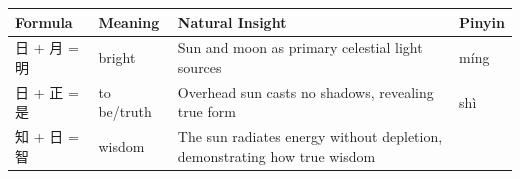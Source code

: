 \begin{longtable}[]{@{}llll@{}}
\toprule
\begin{minipage}[b]{0.19\columnwidth}\raggedright
Formula\strut
\end{minipage} & \begin{minipage}[b]{0.19\columnwidth}\raggedright
Meaning\strut
\end{minipage} & \begin{minipage}[b]{0.33\columnwidth}\raggedright
Natural Insight\strut
\end{minipage} & \begin{minipage}[b]{0.19\columnwidth}\raggedright
Pinyin\strut
\end{minipage}\tabularnewline
\midrule
\endhead
\begin{minipage}[t]{0.19\columnwidth}\raggedright
日 + 月 = 明\strut
\end{minipage} & \begin{minipage}[t]{0.19\columnwidth}\raggedright
bright\strut
\end{minipage} & \begin{minipage}[t]{0.33\columnwidth}\raggedright
Sun and moon as primary celestial light sources\strut
\end{minipage} & \begin{minipage}[t]{0.19\columnwidth}\raggedright
míng\strut
\end{minipage}\tabularnewline
\begin{minipage}[t]{0.19\columnwidth}\raggedright
日 + 正 = 是\strut
\end{minipage} & \begin{minipage}[t]{0.19\columnwidth}\raggedright
to be/truth\strut
\end{minipage} & \begin{minipage}[t]{0.33\columnwidth}\raggedright
Overhead sun casts no shadows, revealing true form\strut
\end{minipage} & \begin{minipage}[t]{0.19\columnwidth}\raggedright
shì\strut
\end{minipage}\tabularnewline
\begin{minipage}[t]{0.19\columnwidth}\raggedright
知 + 日 = 智\strut
\end{minipage} & \begin{minipage}[t]{0.19\columnwidth}\raggedright
wisdom\strut
\end{minipage} & \begin{minipage}[t]{0.33\columnwidth}\raggedright
The sun radiates energy without depletion, demonstrating how true wisdom

\end{minipage}
\end{longtable}

